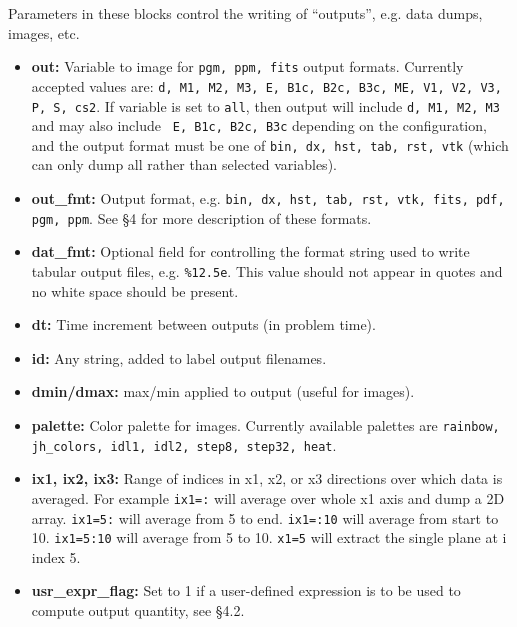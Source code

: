 Parameters in these blocks control the writing of ``outputs'',
e.g. data dumps, images, etc.
\begin{itemize}

\item {\bf out:} Variable to image for {\tt pgm, ppm, fits} output
formats.  Currently accepted values are: {\tt d, M1, M2, M3, E, B1c,
B2c, B3c, ME, V1, V2, V3, P, S, cs2}.  If variable is set to {\tt all},
then output will include {\tt d, M1, M2, M3} and may also include {\tt
E, B1c, B2c, B3c} depending on the configuration, and the output format
must be one of {\tt bin, dx, hst, tab, rst, vtk} (which can only dump
all rather than selected variables).

\item {\bf out\_fmt:} Output format, e.g.  
{\tt bin, dx, hst, tab, rst, vtk, fits, pdf, pgm, ppm}.  See \S 4 for more
description of these formats.

\item {\bf dat\_fmt:} Optional field for controlling the format string used 
to write tabular output files, e.g. {\tt \%12.5e}.  This value should
not appear in quotes and no white space should be present.

\item {\bf dt:} Time increment between outputs (in problem time).

\item {\bf id:} Any string, added to label output filenames.

\item {\bf dmin/dmax:} max/min applied to output (useful for images).

\item {\bf palette:} Color palette for images.  Currently available palettes
are {\tt rainbow, jh\_colors, idl1, idl2, step8, step32, heat}.

\item {\bf ix1, ix2, ix3:} Range of indices in x1, x2, or x3 directions over
which data is averaged.  For example {\tt ix1=:} will average over whole x1 axis
and dump a 2D array.  {\tt ix1=5:} will average from 5 to end. {\tt ix1=:10}
will average from start to 10. {\tt ix1=5:10} will average from 5 to 10.
{\tt x1=5} will extract the single plane at i index 5.

\item {\bf usr\_expr\_flag:} Set to 1 if a user-defined expression is to
be used to compute output quantity, see \S 4.2.

\end{itemize}

